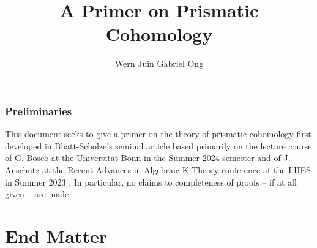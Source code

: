 \documentclass{amsart}
\theoremstyle{definition}
\numberwithin{equation}{section}
\begin{document}
\large
\title[A Prismatic Primer]{A Primer on Prismatic Cohomology}
\author{Wern Juin Gabriel Ong}
\address{Universit\"{a}t Bonn, Bonn, D-53111}
\maketitle
\section*{Preliminaries}
This document seeks to give a primer on the theory of prismatic cohomology first developed in Bhatt-Scholze's seminal article \cite{BSPrismatic} based primarily on the lecture course of G. Bosco at the Universit\"{a}t Bonn in the Summer 2024 semester \cite{Bosco} and of J. Ansch\"{u}tz at the Recent Advances in Algebraic K-Theory conference at the I'HES in Summer 2023 \cite{Anschutz}. In particular, no claims to completeness of proofs -- if at all given -- are made. 
\tableofcontents
\newpage








\part*{End Matter}
\printbibliography
\end{document}
